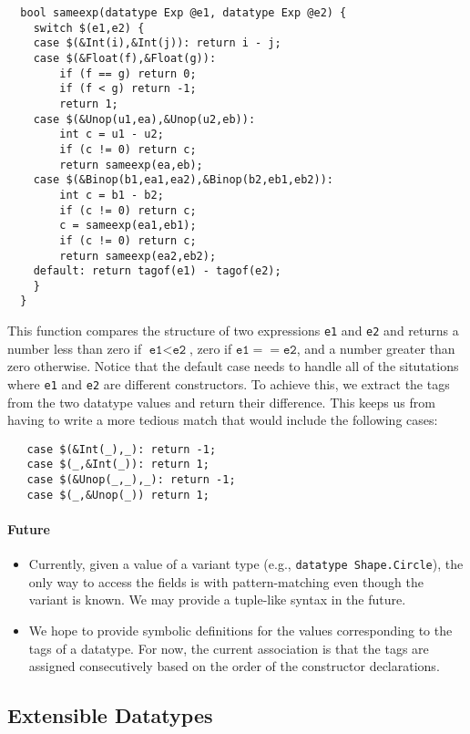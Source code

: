 \begin{verbatim}
  bool sameexp(datatype Exp @e1, datatype Exp @e2) {
    switch $(e1,e2) {
    case $(&Int(i),&Int(j)): return i - j;
    case $(&Float(f),&Float(g)): 
        if (f == g) return 0;
        if (f < g) return -1;
        return 1;
    case $(&Unop(u1,ea),&Unop(u2,eb)): 
        int c = u1 - u2;
        if (c != 0) return c;
        return sameexp(ea,eb);
    case $(&Binop(b1,ea1,ea2),&Binop(b2,eb1,eb2)):
        int c = b1 - b2;
        if (c != 0) return c;
        c = sameexp(ea1,eb1);
        if (c != 0) return c;
        return sameexp(ea2,eb2);
    default: return tagof(e1) - tagof(e2);
    }
  }
\end{verbatim}

This function compares the structure of two expressions 
\texttt{e1} and \texttt{e2}
and returns a number less than zero if $\texttt{e1} < \texttt{e2}$,
zero if $\texttt{e1} == \texttt{e2}$, and a number greater than zero
otherwise.  Notice that the default case needs to handle all of
the situtations where \texttt{e1} and \texttt{e2} are different
constructors.  To achieve this, we extract the tags from the
two datatype values and return their difference.  This keeps us
from having to write a more tedious match that would include
the following cases:

\begin{verbatim}
   case $(&Int(_),_): return -1;
   case $(_,&Int(_)): return 1;
   case $(&Unop(_,_),_): return -1;
   case $(_,&Unop(_)) return 1;
\end{verbatim}

\paragraph{Future}
\begin{itemize}
\item Currently, given a value of a variant type (e.g.,
  \texttt{datatype Shape.Circle}), the only way to access the fields is
  with pattern-matching even though the variant is known.  We may
  provide a tuple-like syntax in the future.
\item We hope to provide symbolic definitions for the values corresponding
  to the tags of a datatype.  For now, the current association is that
  the tags are assigned consecutively based on the order of the 
  constructor declarations.  
\end{itemize}

\subsection{Extensible Datatypes}\hypertarget{xdatatype_sec}{}

